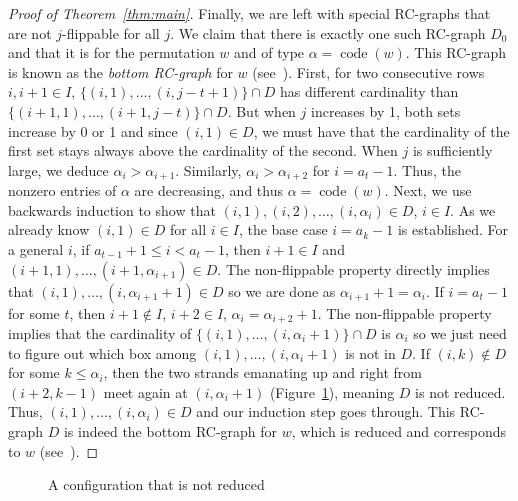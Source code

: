 \documentclass[10pt]{amsart}
\DeclareMathOperator{\code}{code}
\begin{document}
\begin{proof}[Proof of Theorem~\ref{thm:main}]
Finally, we are left with special RC-graphs that are not $j$-flippable for all $j$. We claim that there is exactly one such RC-graph $D_0$ and that it is for the permutation $w$ and of type $\alpha=\code(w)$. This RC-graph is known as the \emph{bottom RC-graph} for $w$ (see~\cite{bergeron1993rc}). First, for two consecutive rows $i,i+1\in I$, $\{(i,1),\ldots,(i,j-t+1)\}\cap D$ has different cardinality than $\{(i+1,1),\ldots,(i+1,j-t)\}\cap D$. But when $j$ increases by 1, both sets increase by 0 or 1 and since $(i,1)\in D$, we must have that the cardinality of the first set stays always above the cardinality of the second. When $j$ is sufficiently large, we deduce $\alpha_i>\alpha_{i+1}$. Similarly, $\alpha_i>\alpha_{i+2}$ for $i=a_t-1$. Thus, the nonzero entries of $\alpha$ are decreasing, and thus $\alpha=\code(w)$. Next, we use backwards induction to show that $(i,1),(i,2),\ldots,(i,\alpha_i)\in D$, $i\in I$. As we already know $(i,1)\in D$ for all $i\in I$, the base case $i=a_k-1$ is established. For a general $i$, if $a_{t-1}+1\leq i< a_t-1$, then $i+1\in I$ and $(i+1,1),\ldots,(i+1,\alpha_{i+1})\in D$. The non-flippable property directly implies that $(i,1),\ldots,(i,\alpha_{i+1}+1)\in D$ so we are done as $\alpha_{i+1}+1=\alpha_i$. If $i=a_t-1$ for some $t$, then $i+1\notin I$, $i+2\in I$, $\alpha_{i}=\alpha_{i+2}+1$. The non-flippable property implies that the cardinality of $\{(i,1),\ldots,(i,\alpha_i+1)\}\cap D$ is $\alpha_i$ so we just need to figure out which box among $(i,1),\ldots,(i,\alpha_i+1)$ is not in $D$. If $(i,k)\notin D$ for some $k\leq\alpha_i$, then the two strands emanating up and right from $(i+2,k-1)$ meet again at $(i,\alpha_{i}+1)$ (Figure~\ref{fig:indNon}), meaning $D$ is not reduced. Thus, $(i,1),\ldots,(i,\alpha_i)\in D$ and our induction step goes through. This RC-graph $D$ is indeed the bottom RC-graph for $w$, which is reduced and corresponds to $w$ (see~\cite{bergeron1993rc}).
\end{proof}

\begin{figure}[h!]
\centering
{}
\caption{A configuration that is not reduced}
\label{fig:indNon}
\end{figure}
\end{document}
